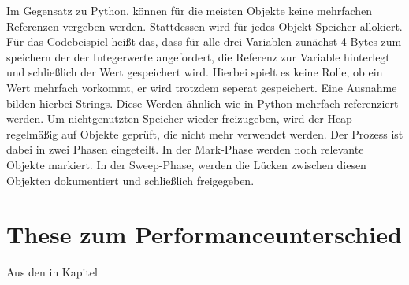 Im Gegensatz zu Python, können für die meisten Objekte keine mehrfachen Referenzen vergeben werden. Stattdessen wird für jedes 
Objekt Speicher allokiert. Für das Codebeispiel heißt das, dass für alle drei Variablen zunächst 4 Bytes zum speichern der 
der Integerwerte angefordert, die Referenz zur Variable hinterlegt und schließlich der Wert gespeichert wird. Hierbei spielt 
es keine Rolle, ob ein Wert mehrfach vorkommt, er wird trotzdem seperat gespeichert. Eine Ausnahme bilden hierbei Strings. 
Diese Werden ähnlich wie in Python mehrfach referenziert werden. Um nichtgenutzten Speicher wieder freizugeben, wird der Heap 
regelmäßig auf Objekte geprüft, die nicht mehr verwendet werden. Der Prozess ist dabei in zwei Phasen eingeteilt. In der Mark-Phase 
werden noch relevante Objekte markiert. In der Sweep-Phase, werden die Lücken zwischen diesen Objekten dokumentiert und schließlich 
freigegeben.\autocite[Vgl.][]{OracleGC.2021}

\section{These zum Performanceunterschied}

Aus den in Kapitel 